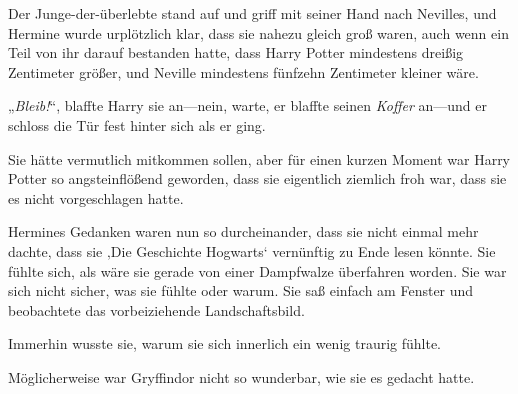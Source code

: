 Der Junge-der-überlebte stand auf und griff mit seiner Hand nach Nevilles, und Hermine wurde urplötzlich klar, dass sie nahezu gleich groß waren, auch wenn ein Teil von ihr darauf bestanden hatte, dass Harry Potter mindestens dreißig Zentimeter größer, und Neville mindestens fünfzehn Zentimeter kleiner wäre.

„\emph{Bleib!}“, blaffte Harry sie an—nein, warte, er blaffte seinen \emph{Koffer} an—und er schloss die Tür fest hinter sich als er ging.

Sie hätte vermutlich mitkommen sollen, aber für einen kurzen Moment war Harry Potter so angsteinflößend geworden, dass sie eigentlich ziemlich froh war, dass sie es nicht vorgeschlagen hatte.

Hermines Gedanken waren nun so durcheinander, dass sie nicht einmal mehr dachte, dass sie ‚Die Geschichte Hogwarts‘ vernünftig zu Ende lesen könnte. Sie fühlte sich, als wäre sie gerade von einer Dampfwalze überfahren worden. Sie war sich nicht sicher, was sie fühlte oder warum. Sie saß einfach am Fenster und beobachtete das vorbeiziehende Landschaftsbild.

Immerhin wusste sie, warum sie sich innerlich ein wenig traurig fühlte.

Möglicherweise war Gryffindor nicht so wunderbar, wie sie es gedacht hatte.


